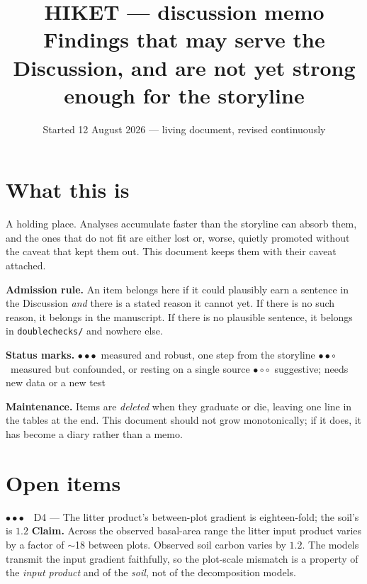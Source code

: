 \documentclass[11pt]{article}
\title{HIKET --- discussion memo\\
  \large Findings that may serve the Discussion, and are not yet strong enough for the storyline}
\author{}
\date{Started 12 August 2026 --- living document, revised continuously}
\newcommand{\stA}{\textcolor{stgood}{$\bullet\bullet\bullet$}}  %
\newcommand{\stB}{\textcolor{stmid}{$\bullet\bullet\circ$}}     %
\newcommand{\stC}{\textcolor{stweak}{$\bullet\circ\circ$}}      %
\begin{document}
\maketitle

\section*{What this is}

A holding place. Analyses accumulate faster than the storyline can absorb them, and the
ones that do not fit are either lost or, worse, quietly promoted without the caveat that
kept them out. This document keeps them with their caveat attached.

\medskip
\noindent\textbf{Admission rule.} An item belongs here if it could plausibly earn a
sentence in the Discussion \emph{and} there is a stated reason it cannot yet. If there is
no such reason, it belongs in the manuscript. If there is no plausible sentence, it
belongs in \texttt{doublechecks/} and nowhere else.

\medskip
\noindent\textbf{Status marks.}\quad
\stA~measured and robust, one step from the storyline \quad
\stB~measured but confounded, or resting on a single source \quad
\stC~suggestive; needs new data or a new test

\medskip
\noindent\textbf{Maintenance.} Items are \emph{deleted} when they graduate or die, leaving
one line in the tables at the end. This document should not grow monotonically; if it
does, it has become a diary rather than a memo.

\section{Open items}

\begin{finding}{\stA\ \ D4 --- The litter product's between-plot gradient is eighteen-fold; the soil's is $1.2$}
\textbf{Claim.} Across the observed basal-area range the litter input product varies by a factor of
$\sim$18 between plots. Observed soil carbon varies by $1.2$. The models transmit the input gradient
faithfully, so the plot-scale mismatch is a property of the \emph{input product} and of the
\emph{soil}, not of the decomposition models.
\end{finding}
\end{document}
